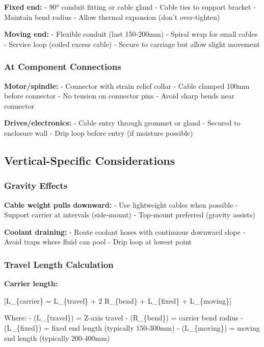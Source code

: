 \documentclass[
]{article}
\begin{document}
\textbf{Fixed end:} - 90° conduit fitting or cable gland - Cable ties to
support bracket - Maintain bend radius - Allow thermal expansion (don't
over-tighten)

\textbf{Moving end:} - Flexible conduit (last 150-200mm) - Spiral wrap
for small cables - Service loop (coiled excess cable) - Secure to
carriage but allow slight movement

\subsubsection{At Component Connections}\label{at-component-connections}

\textbf{Motor/spindle:} - Connector with strain relief collar - Cable
clamped 100mm before connector - No tension on connector pins - Avoid
sharp bends near connector

\textbf{Drives/electronics:} - Cable entry through grommet or gland -
Secured to enclosure wall - Drip loop before entry (if moisture
possible)

\subsection{Vertical-Specific
Considerations}\label{vertical-specific-considerations}

\subsubsection{Gravity Effects}\label{gravity-effects}

\textbf{Cable weight pulls downward:} - Use lightweight cables when
possible - Support carrier at intervals (side-mount) - Top-mount
preferred (gravity assists)

\textbf{Coolant draining:} - Route coolant hoses with continuous
downward slope - Avoid traps where fluid can pool - Drip loop at lowest
point

\subsubsection{Travel Length
Calculation}\label{travel-length-calculation}

\textbf{Carrier length:}

{[}L\_\{carrier\} = L\_\{travel\} + 2 \times R\_\{bend\} + L\_\{fixed\}
+ L\_\{moving\}{]}

Where: - (L\_\{travel\}) = Z-axis travel - (R\_\{bend\}) = carrier bend
radius - (L\_\{fixed\}) = fixed end length (typically 150-300mm) -
(L\_\{moving\}) = moving end length (typically 200-400mm)
\end{document}
